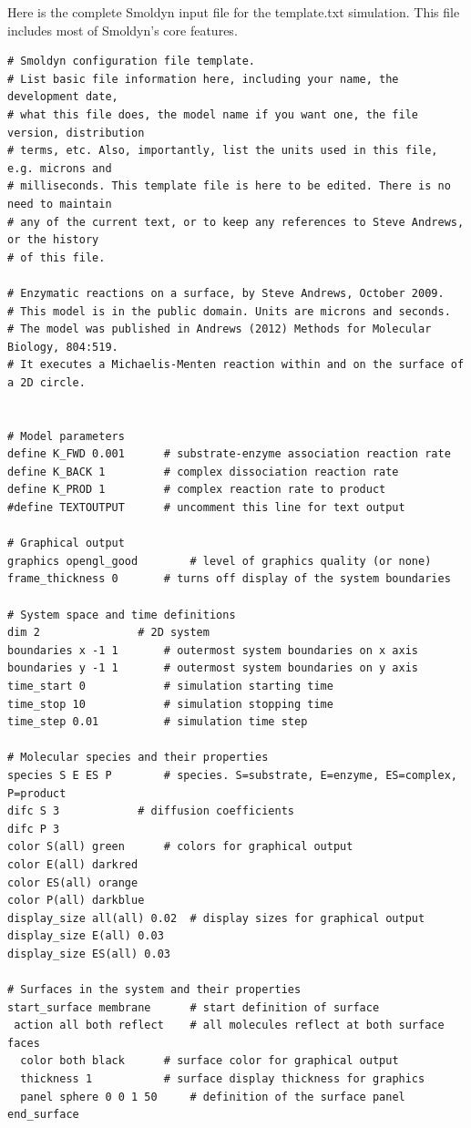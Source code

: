 \documentclass {scrbook}
\begin{document}
Here is the complete Smoldyn input file for the template.txt simulation. This file includes most of Smoldyn's core features.

\begin{lstlisting}[style=SSAC]
# Smoldyn configuration file template.
# List basic file information here, including your name, the development date,
# what this file does, the model name if you want one, the file version, distribution
# terms, etc. Also, importantly, list the units used in this file, e.g. microns and
# milliseconds. This template file is here to be edited. There is no need to maintain
# any of the current text, or to keep any references to Steve Andrews, or the history
# of this file.

# Enzymatic reactions on a surface, by Steve Andrews, October 2009.
# This model is in the public domain. Units are microns and seconds.
# The model was published in Andrews (2012) Methods for Molecular Biology, 804:519.
# It executes a Michaelis-Menten reaction within and on the surface of a 2D circle.


# Model parameters
define K_FWD 0.001		# substrate-enzyme association reaction rate
define K_BACK 1			# complex dissociation reaction rate
define K_PROD 1			# complex reaction rate to product
#define TEXTOUTPUT		# uncomment this line for text output

# Graphical output
graphics opengl_good		# level of graphics quality (or none)
frame_thickness 0		# turns off display of the system boundaries

# System space and time definitions
dim 2				# 2D system
boundaries x -1 1		# outermost system boundaries on x axis
boundaries y -1 1		# outermost system boundaries on y axis
time_start 0			# simulation starting time
time_stop 10			# simulation stopping time
time_step 0.01			# simulation time step

# Molecular species and their properties
species S E ES P		# species. S=substrate, E=enzyme, ES=complex, P=product
difc S 3			# diffusion coefficients
difc P 3
color S(all) green		# colors for graphical output
color E(all) darkred
color ES(all) orange
color P(all) darkblue
display_size all(all) 0.02	# display sizes for graphical output
display_size E(all) 0.03
display_size ES(all) 0.03

# Surfaces in the system and their properties
start_surface membrane		# start definition of surface
 action all both reflect	# all molecules reflect at both surface faces
  color both black		# surface color for graphical output
  thickness 1			# surface display thickness for graphics
  panel sphere 0 0 1 50		# definition of the surface panel
end_surface


\end{lstlisting}
\end{document}
